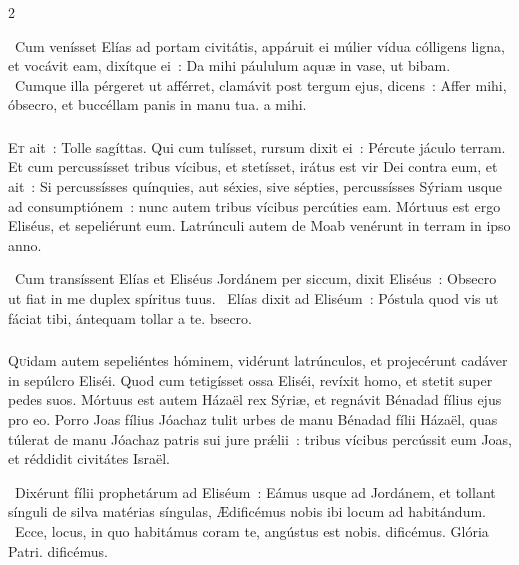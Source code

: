 \documentclass[9pt,twoside]{extarticle}
\begin{document}
\begin{multicols}{2}
{\begin{tightlist}{}
\item {}~Cum venísset Elías ad portam civitátis, appáruit ei múlier vídua cólligens ligna, et vocávit eam, dixítque ei~: \textred{*} Da mihi páululum aquæ in vase, ut bibam. ~Cumque illa pérgeret ut afférret, clamávit post tergum ejus, dicens~: Affer mihi, óbsecro, et buccéllam panis in manu tua. a mihi.
\end{tightlist}

\subsubsection*{\center {}}
\lettrine{E}t ait~: Tolle sagíttas. Qui cum tulísset, rursum dixit ei~: Pércute jáculo terram. Et cum percussísset tribus vícibus, et stetísset,
irátus est vir Dei contra eum, et ait~: Si percussísses quínquies, aut séxies, sive sépties, percussísses Sýriam usque ad consumptiónem~: nunc autem tribus vícibus percúties eam.
Mórtuus est ergo Eliséus, et sepeliérunt eum. Latrúnculi autem de Moab venérunt in terram in ipso anno.

\begin{tightlist}{}
\item {}~Cum transíssent Elías et Eliséus Jordánem per siccum, dixit Eliséus~: \textred{*} Obsecro ut fiat in me duplex spíritus tuus. ~Elías dixit ad Eliséum~: Póstula quod vis ut fáciat tibi, ántequam tollar a te. bsecro.
\end{tightlist}

\subsubsection*{\center {}}
\lettrine{Q}uidam autem sepeliéntes hóminem, vidérunt latrúnculos, et projecérunt cadáver in sepúlcro Eliséi. Quod cum tetigísset ossa Eliséi, revíxit homo, et stetit super pedes suos. Mórtuus est autem Házaël rex Sýriæ, et regnávit Bénadad fílius ejus pro eo.
Porro Joas fílius Jóachaz tulit urbes de manu Bénadad fílii Házaël, quas túlerat de manu Jóachaz patris sui jure prǽlii~: tribus vícibus percússit eum Joas, et réddidit civitátes Israël.

\begin{tightlist}{}
\item {}~Dixérunt fílii prophetárum ad Eliséum~: Eámus usque ad Jordánem, et tollant sínguli de silva matérias síngulas, \textred{*} Ædificémus nobis ibi locum ad habitándum. ~Ecce, locus, in quo habitámus coram te, angústus est nobis. dificémus. Glória Patri. dificémus.
\end{tightlist}

}
\end{multicols}
\end{document}
